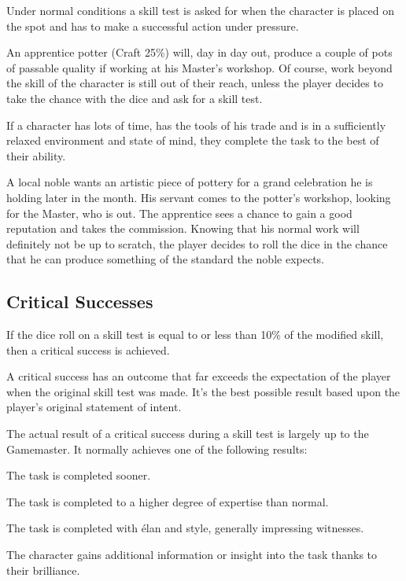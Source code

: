 Under normal conditions a skill test is asked for when the character is placed on the spot and has to make a successful action under pressure. 

\begin{rpg-examplebox}
An apprentice potter (Craft 25\%) will, day in day out, produce a couple of pots of passable quality if working at his Master’s workshop. Of course, work beyond the skill of the character is still out of their reach, unless the player decides to take the chance with the dice and ask for a skill test.
\end{rpg-examplebox}

If a character has lots of time, has the tools of his trade and is in a sufficiently relaxed environment and state of mind, they complete the task to the best of their ability. 

\begin{rpg-examplebox}
A local noble wants an artistic piece of pottery for a grand celebration he is holding later in the month. His servant comes to the potter’s workshop, looking for the Master, who is out. The apprentice sees a chance to gain a good reputation and takes the commission. Knowing that his normal work will definitely not be up to scratch, the player decides to roll the dice in the chance that he can produce something of the standard the noble expects.
\end{rpg-examplebox}

\subsection{Critical Successes}
If the dice roll on a skill test is equal to or less than 10\% of the modified skill, then a critical success is achieved. 

A critical success has an outcome that far exceeds the expectation of the player when the original skill test was made. It’s the best possible result based upon the player’s original statement of intent.

The actual result of a critical success during a skill test is largely up to the Gamemaster. It normally achieves one of the following results: 

\begin{rpg-list}
\item The task is completed sooner. 
\item The task is completed to a higher degree of expertise than normal. 
\item The task is completed with élan and style, generally impressing witnesses. 
\item The character gains additional information or insight into the task thanks to their brilliance. 
\end{rpg-list}

